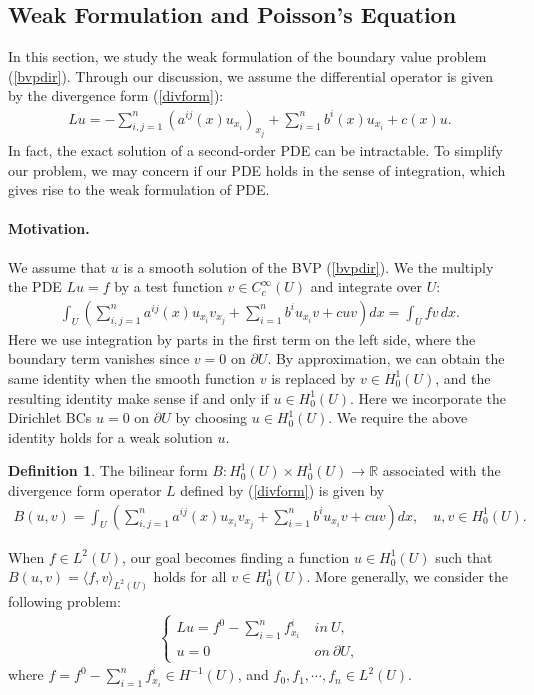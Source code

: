 \documentclass{article}
\numberwithin{equation}{section}
\newcommand{\bbR}{\mathbb{R}}
\theoremstyle{plain}
\theoremstyle{definition}
\newtheorem{definition}[theorem]{Definition}
\begin{document}
\subsection{Weak Formulation and Poisson's Equation}
In this section, we study the weak formulation of the boundary value problem (\ref{bvpdir}). Through our discussion, we assume the differential operator is given by the divergence form (\ref{divform}):
\begin{align*}
	Lu=-\sum_{i,j=1}^n\left(a^{ij}(x)u_{x_i}\right)_{x_j}+\sum_{i=1}^n b^i(x)u_{x_i}+c(x)u.
\end{align*}
In fact, the exact solution of a second-order PDE can be intractable. To simplify our problem, we may concern if our PDE holds in the sense of integration, which gives rise to the weak formulation of PDE.

\paragraph{Motivation.} We assume that $u$ is a smooth solution of the BVP (\ref{bvpdir}). We the multiply the PDE $Lu=f$ by a test function $v\in C_c^\infty(U)$ and integrate over $U$:
\begin{align*}
	\int_U\left(\sum_{i,j=1}^n a^{ij}(x)u_{x_i}v_{x_j}+\sum_{i=1}^n b^iu_{x_i}v + cuv\right)dx=\int_U fv\,dx.
\end{align*}
Here we use integration by parts in the first term on the left side, where the boundary term vanishes since $v=0$ on $\partial U$. By approximation, we can obtain the same identity when the smooth function $v$ is replaced by $v\in H_0^1(U)$, and the resulting identity make sense if and only if $u\in H_0^1(U)$. Here we incorporate the Dirichlet BCs $u=0$ on $\partial U$ by choosing $u\in H_0^1(U)$. We require the above identity holds for a weak solution $u$.

\begin{definition}
The bilinear form $B:H_0^1(U)\times H_0^1(U)\to\bbR$ associated with the divergence form operator $L$ defined by (\ref{divform}) is given by
\begin{align*}
	B(u,v)=\int_U\left(\sum_{i,j=1}^n a^{ij}(x)u_{x_i}v_{x_j}+\sum_{i=1}^n b^iu_{x_i}v + cuv\right)dx,\quad u,v\in H_0^1(U).
\end{align*}
\end{definition}

When $f\in L^2(U)$, our goal becomes finding a function $u\in H_0^1(U)$ such that $B(u,v)=\langle f,v\rangle_{L^2(U)}$ holds for all $v\in H_0^1(U)$. More generally, we consider the following problem:
\begin{align}
	\begin{cases}
		Lu=f^0-\sum_{i=1}^n f^i_{x_i}\ &in\ U,\\
		u=0\ &on\ \partial U,
	\end{cases}\label{pdeelliptic}
\end{align}
where $f=f^0-\sum_{i=1}^n f^i_{x_i}\in H^{-1}(U)$, and $f_0,f_1,\cdots,f_n\in L^2(U)$.
\end{document}

